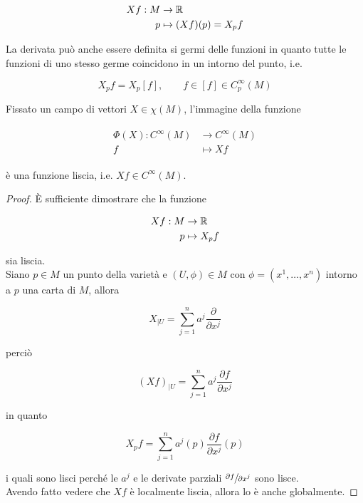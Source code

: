 \begin{align}
	\begin{split}
		X f : M &\to \mathbb{R}\\
		p &\mapsto (X f)(p) = X_{p} f
	\end{split}
\end{align}

La derivata può anche essere definita si germi delle funzioni in quanto tutte le funzioni di uno stesso germe coincidono in un intorno del punto, i.e.

\begin{equation}
	X_{p} f = X_{p} [f], \qquad f \in [f] \in C_{p}^{\infty}(M)
\end{equation}

\begin{definition}
	Fissato un campo di vettori $ X \in \chi(M) $, l'immagine della funzione
	
	\begin{align}
		\begin{split}
			\Phi(X) : C^{\infty}(M) &\to C^{\infty}(M)\\
			f &\mapsto X f
		\end{split}
	\end{align}

	è una funzione liscia, i.e. $ X f \in C^{\infty}(M) $.
\end{definition}

\begin{proof}
	\`{E} sufficiente dimostrare che la funzione
	
	\begin{align}
		\begin{split}
			X f : M &\to \mathbb{R}\\
			p &\mapsto X_{p} f
		\end{split}
	\end{align}

	sia liscia.\\
	Siano $ p \in M $ un punto della varietà e $ (U,\phi) \in M $ con $ \phi = (x^{1},\dots,x^{n}) $ intorno a $ p $ una carta di $ M $, allora
	
	\begin{equation}
		X_{|U} = \sum_{j=1}^{n} a^{j} \dfrac{\partial}{\partial x^{j}}
	\end{equation}

	perciò
	
	\begin{equation}
		(X f)_{|U} = \sum_{j=1}^{n} a^{j} \dfrac{\partial f}{\partial x^{j}}
	\end{equation}

	in quanto
	
	\begin{equation}
		X_{p} f = \sum_{j=1}^{n} a^{j}(p) \dfrac{\partial f}{\partial x^{j}} (p)
	\end{equation}

	i quali sono lisci perché le $ a^{j} $ e le derivate parziali $ \sfrac{\partial f}{\partial x^{j}} $ sono lisce.\\
	Avendo fatto vedere che $ X f $ è localmente liscia, allora lo è anche globalmente.
\end{proof}

